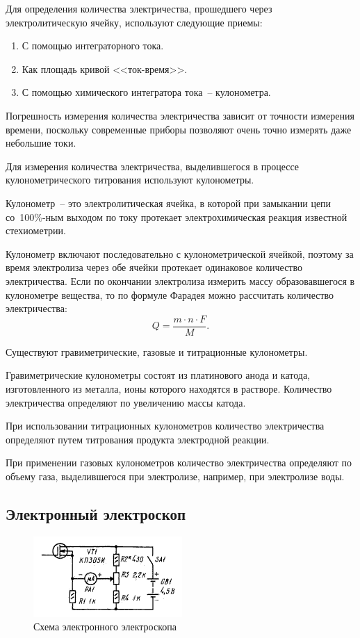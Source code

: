 \documentclass[pscyr,titlepage]{hedreport}
\begin{document}
  Для определения количества электричества, прошедшего через электролитическую
  ячейку, используют следующие приемы:
  \begin{enumerate}
    \item С помощью интеграторного тока.
    \item Как площадь кривой <<ток-время>>.
    \item С помощью химического интегратора тока~-- кулонометра.
  \end{enumerate}

  Погрешность измерения количества электричества зависит от точности измерения
  времени, поскольку современные приборы позволяют очень точно измерять даже
  небольшие токи.

  Для измерения количества электричества, выделившегося в процессе
  кулонометрического титрования используют кулонометры.

  Кулонометр~-- это электролитическая ячейка, в которой при замыкании цепи
  со~100\%-ным выходом по току протекает электрохимическая реакция известной
  стехиометрии.

  Кулонометр включают последовательно с кулонометрической ячейкой, поэтому за
  время электролиза через обе ячейки протекает одинаковое количество
  электричества. Если по окончании электролиза измерить массу образовавшегося в
  кулонометре вещества, то по формуле Фарадея можно рассчитать количество
  электричества:
  \[
    Q = \frac{m\cdot n\cdot F}{M}.
  \]

  Существуют гравиметрические, газовые и титрационные кулонометры.

  Гравиметрические кулонометры состоят из платинового анода и катода,
  изготовленного из металла, ионы которого находятся в растворе. Количество
  электричества определяют по увеличению массы катода.

  При использовании титрационных кулонометров количество электричества
  определяют путем титрования продукта электродной реакции.

  При применении газовых кулонометров количество электричества определяют по
  объему газа, выделившегося при электролизе, например, при электролизе воды.

  \subsection{Электронный электроскоп}

  \begin{figure}[ht]
    \center
    \includegraphics{sl_5_1}
    \caption{Схема электронного электроскопа}
    \label{picElElec}
  \end{figure}
\end{document}
